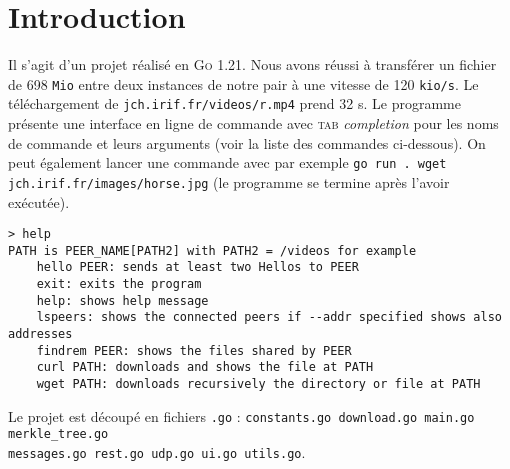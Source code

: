 \section{Introduction}
Il s'agit d'un projet réalisé en \textsc{Go} 1.21. Nous avons réussi à transférer un fichier de 698 \texttt{Mio} entre deux instances de notre pair à une vitesse de 120 \texttt{kio/s}. Le téléchargement de \texttt{jch.irif.fr/videos/r.mp4} prend 32 s. Le programme présente une interface en ligne de commande avec \textsc{tab} \textit{completion} pour les noms de commande et leurs arguments (voir la liste des commandes ci-dessous). On peut également lancer une commande avec par exemple \texttt{go run . wget jch.irif.fr/images/horse.jpg} (le programme se termine après l'avoir exécutée).

\begin{verbatim}
> help
PATH is PEER_NAME[PATH2] with PATH2 = /videos for example
    hello PEER: sends at least two Hellos to PEER
    exit: exits the program
    help: shows help message
    lspeers: shows the connected peers if --addr specified shows also addresses
    findrem PEER: shows the files shared by PEER
    curl PATH: downloads and shows the file at PATH
    wget PATH: downloads recursively the directory or file at PATH
\end{verbatim}
Le projet est découpé en fichiers \texttt{.go} : \texttt{constants.go download.go main.go merkle_tree.go}\\
\texttt{messages.go rest.go udp.go ui.go utils.go}.

